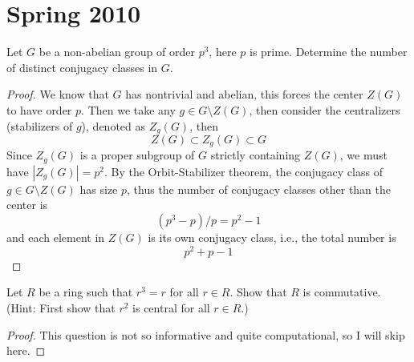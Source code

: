 \documentclass[openany]{book}
\begin{document}
\chapter{Spring 2010}



\begin{prob}
    Let \(G\) be a non-abelian group of order \(p^3\), here \(p\) is prime. Determine the number of distinct conjugacy classes in \(G\).
\end{prob}
\begin{proof}
    We know that $G$ has nontrivial and abelian, this forces the center $Z(G)$ to have order $p$. Then we take any $g\in G\setminus Z(G)$, then consider the centralizers (stabilizers of $g$), denoted as $Z_g(G)$, then 
    \begin{equation*}
        Z(G)\subset Z_g(G)\subset G
    \end{equation*}
    Since $Z_g(G)$ is a proper subgroup of $G$ strictly containing $Z(G)$, we must have $|Z_g(G)|=p^2$. By the Orbit-Stabilizer theorem, the conjugacy class of $g\in G\setminus Z(G)$ has size $p$, thus the number of conjugacy classes other than the center is 
    \begin{equation*}
        (p^3-p)/p=p^2-1
    \end{equation*}
    and each element in $Z(G)$ is its own conjugacy class, i.e., the total number is 
    \begin{equation*}
        p^2+p-1
    \end{equation*}
\end{proof}


\begin{prob}
    Let \(R\) be a ring such that \(r^3 = r\) for all \(r \in R\). Show that \(R\) is commutative. (Hint: First show that \(r^2\) is central for all \(r \in R\).)
\end{prob}
\begin{proof}
    This question is not so informative and quite computational, so I will skip here.
\end{proof}
\end{document}
